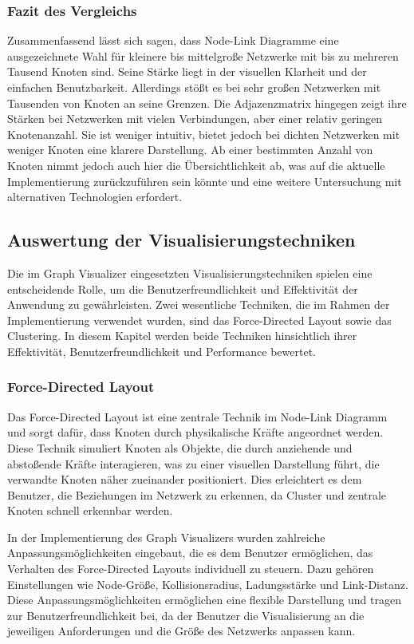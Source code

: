 \subsubsection{Fazit des Vergleichs}

Zusammenfassend lässt sich sagen, dass Node-Link Diagramme eine ausgezeichnete Wahl für kleinere bis mittelgroße Netzwerke mit bis zu mehreren Tausend Knoten sind. Seine Stärke liegt in der visuellen Klarheit und der einfachen Benutzbarkeit. Allerdings stößt es bei sehr großen Netzwerken mit Tausenden von Knoten an seine Grenzen. Die Adjazenzmatrix hingegen zeigt ihre Stärken bei Netzwerken mit vielen Verbindungen, aber einer relativ geringen Knotenanzahl. Sie ist weniger intuitiv, bietet jedoch bei dichten Netzwerken mit weniger Knoten eine klarere Darstellung. Ab einer bestimmten Anzahl von Knoten nimmt jedoch auch hier die Übersichtlichkeit ab, was auf die aktuelle Implementierung zurückzuführen sein könnte und eine weitere Untersuchung mit alternativen Technologien erfordert.

\subsection{Auswertung der Visualisierungstechniken}

Die im Graph Visualizer eingesetzten Visualisierungstechniken spielen eine entscheidende Rolle, um die Benutzerfreundlichkeit und Effektivität der Anwendung zu gewährleisten. Zwei wesentliche Techniken, die im Rahmen der Implementierung verwendet wurden, sind das Force-Directed Layout sowie das Clustering. In diesem Kapitel werden beide Techniken hinsichtlich ihrer Effektivität, Benutzerfreundlichkeit und Performance bewertet.

\subsubsection{Force-Directed Layout}

Das Force-Directed Layout ist eine zentrale Technik im Node-Link Diagramm und sorgt dafür, dass Knoten durch physikalische Kräfte angeordnet werden. Diese Technik simuliert Knoten als Objekte, die durch anziehende und abstoßende Kräfte interagieren, was zu einer visuellen Darstellung führt, die verwandte Knoten näher zueinander positioniert. Dies erleichtert es dem Benutzer, die Beziehungen im Netzwerk zu erkennen, da Cluster und zentrale Knoten schnell erkennbar werden.

In der Implementierung des Graph Visualizers wurden zahlreiche Anpassungsmöglichkeiten eingebaut, die es dem Benutzer ermöglichen, das Verhalten des Force-Directed Layouts individuell zu steuern. Dazu gehören Einstellungen wie Node-Größe, Kollisionsradius, Ladungsstärke und Link-Distanz. Diese Anpassungsmöglichkeiten ermöglichen eine flexible Darstellung und tragen zur Benutzerfreundlichkeit bei, da der Benutzer die Visualisierung an die jeweiligen Anforderungen und die Größe des Netzwerks anpassen kann.

